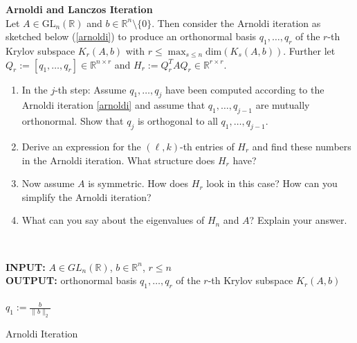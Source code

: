\textbf{Arnoldi and Lanczos Iteration}\\
Let $A\in \text{GL}_n(\mathbb{R})$ and $b\in\mathbb{R}^n\setminus \{0\}$. Then consider the Arnoldi iteration as sketched below (\ref{arnoldi}) to produce an orthonormal basis $q_1,\ldots, q_r$ of the $r$-th Krylov subspace $K_r(A,b)$ with $r \leq \max_{s\leq n} \text{dim}(K_s(A,b))$. Further let $Q_r := [q_1,\ldots, q_{r}] \in \mathbb{R}^{n \times r}$ and $H_r := Q_r^TAQ_r \in \mathbb{R}^{r\times r}$.
\begin{enumerate}
	\item In the $j$-th step: Assume $q_1,\ldots, q_{j}$ have been computed according to the Arnoldi iteration \ref{arnoldi} and assume that $q_1,\ldots, q_{j-1}$ are mutually orthonormal. Show that $q_j$ is orthogonal to all $q_1,\ldots, q_{j-1}$.
	\item Derive an expression for the $(\ell,k)$-th entries of $H_r$ and find these numbers in the Arnoldi iteration. What structure does $H_r$ have?
	\item Now assume $A$ is symmetric. How does $H_r$ look in this case? How can you simplify the Arnoldi iteration?
	\item What can you say about the eigenvalues of $H_n$ and $A$? Explain your answer.
\end{enumerate}

~\\
\begin{algorithm}
		\textbf{INPUT:} $A\in GL_n(\mathbb{R})$, $b \in \mathbb{R}^n$, $r\leq n$\\
	\textbf{OUTPUT:} orthonormal basis $q_1,\ldots, q_r$ of the $r$-th Krylov subspace $K_r(A,b)$\\~\\
	$q_1 := \frac{b}{\|b\|_2}$\\

\caption{Arnoldi Iteration}
\label{arnoldi}
\end{algorithm}	